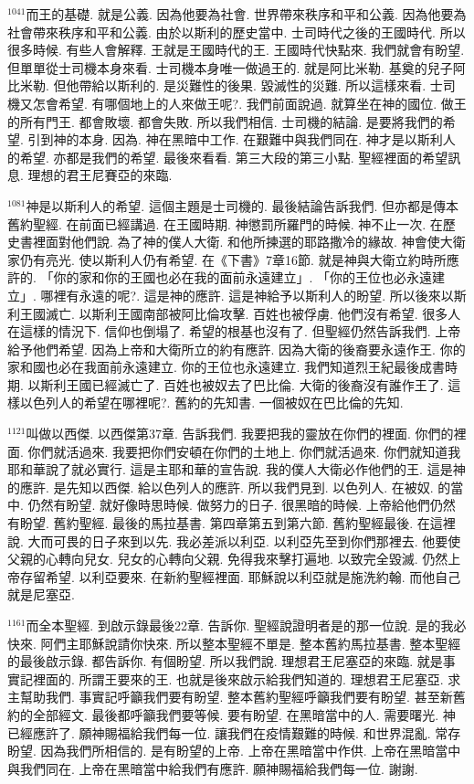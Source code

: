 \documentclass{book}
\begin{document}
$^{1041}$而王的基礎.
就是公義.
因為他要為社會.
世界帶來秩序和平和公義.
因為他要為社會帶來秩序和平和公義.
由於以斯利的歷史當中.
士司時代之後的王國時代.
所以很多時候.
有些人會解釋.
王就是王國時代的王.
王國時代快點來.
我們就會有盼望.
但單單從士司機本身來看.
士司機本身唯一做過王的.
就是阿比米勒.
基奠的兒子阿比米勒.
但他帶給以斯利的.
是災難性的後果.
毀滅性的災難.
所以這樣來看.
士司機又怎會希望.
有哪個地上的人來做王呢?.
我們前面說過.
就算坐在神的國位.
做王的所有門王.
都會敗壞.
都會失敗.
所以我們相信.
士司機的結論.
是要將我們的希望.
引到神的本身.
因為.
神在黑暗中工作.
在艱難中與我們同在.
神才是以斯利人的希望.
亦都是我們的希望.
最後來看看.
第三大段的第三小點.
聖經裡面的希望訊息.
理想的君王尼賽亞的來臨.

$^{1081}$神是以斯利人的希望.
這個主題是士司機的.
最後結論告訴我們.
但亦都是傳本舊約聖經.
在前面已經講過.
在王國時期.
神懲罰所羅門的時候.
神不止一次.
在歷史書裡面對他們說.
為了神的僕人大衛.
和他所揀選的耶路撒冷的緣故.
神會使大衛家仍有亮光.
使以斯利人仍有希望.
在《下書》7章16節.
就是神與大衛立約時所應許的.
「你的家和你的王國也必在我的面前永遠建立」.
「你的王位也必永遠建立」.
哪裡有永遠的呢?.
這是神的應許.
這是神給予以斯利人的盼望.
所以後來以斯利王國滅亡.
以斯利王國南部被阿比倫攻擊.
百姓也被俘虜.
他們沒有希望.
很多人在這樣的情況下.
信仰也倒塌了.
希望的根基也沒有了.
但聖經仍然告訴我們.
上帝給予他們希望.
因為上帝和大衛所立的約有應許.
因為大衛的後裔要永遠作王.
你的家和國也必在我面前永遠建立.
你的王位也永遠建立.
我們知道烈王紀最後成書時期.
以斯利王國已經滅亡了.
百姓也被奴去了巴比倫.
大衛的後裔沒有誰作王了.
這樣以色列人的希望在哪裡呢?.
舊約的先知書.
一個被奴在巴比倫的先知.

$^{1121}$叫做以西傑.
以西傑第37章.
告訴我們.
我要把我的靈放在你們的裡面.
你們的裡面.
你們就活過來.
我要把你們安頓在你們的土地上.
你們就活過來.
你們就知道我耶和華說了就必實行.
這是主耶和華的宣告說.
我的僕人大衛必作他們的王.
這是神的應許.
是先知以西傑.
給以色列人的應許.
所以我們見到.
以色列人.
在被奴.
的當中.
仍然有盼望.
就好像時思時候.
做努力的日子.
很黑暗的時候.
上帝給他們仍然有盼望.
舊約聖經.
最後的馬拉基書.
第四章第五到第六節.
舊約聖經最後.
在這裡說.
大而可畏的日子來到以先.
我必差派以利亞.
以利亞先至到你們那裡去.
他要使父親的心轉向兒女.
兒女的心轉向父親.
免得我來擊打遍地.
以致完全毀滅.
仍然上帝存留希望.
以利亞要來.
在新約聖經裡面.
耶穌說以利亞就是施洗約翰.
而他自己就是尼塞亞.

$^{1161}$而全本聖經.
到啟示錄最後22章.
告訴你.
聖經說證明者是的那一位說.
是的我必快來.
阿們主耶穌說請你快來.
所以整本聖經不單是.
整本舊約馬拉基書.
整本聖經的最後啟示錄.
都告訴你.
有個盼望.
所以我們說.
理想君王尼塞亞的來臨.
就是事實記裡面的.
所謂王要來的王.
也就是後來啟示給我們知道的.
理想君王尼塞亞.
求主幫助我們.
事實記呼籲我們要有盼望.
整本舊約聖經呼籲我們要有盼望.
甚至新舊約的全部經文.
最後都呼籲我們要等候.
要有盼望.
在黑暗當中的人.
需要曙光.
神已經應許了.
願神賜福給我們每一位.
讓我們在疫情艱難的時候.
和世界混亂.
常存盼望.
因為我們所相信的.
是有盼望的上帝.
上帝在黑暗當中作供.
上帝在黑暗當中與我們同在.
上帝在黑暗當中給我們有應許.
願神賜福給我們每一位.
謝謝.
\newpage
\end{document}
